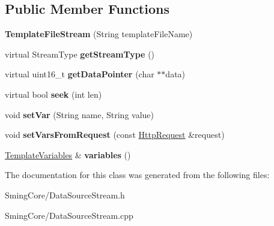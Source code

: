 \subsection*{Public Member Functions}
\begin{DoxyCompactItemize}
\item 
\hypertarget{class_template_file_stream_a3071f6f547c41d51b70e9050f4b8a2d5}{}{\bfseries Template\+File\+Stream} (String template\+File\+Name)\label{class_template_file_stream_a3071f6f547c41d51b70e9050f4b8a2d5}

\item 
\hypertarget{class_template_file_stream_a66a4a81c74f285f1c459243da0f00cc6}{}virtual Stream\+Type {\bfseries get\+Stream\+Type} ()\label{class_template_file_stream_a66a4a81c74f285f1c459243da0f00cc6}

\item 
\hypertarget{class_template_file_stream_a92b7ad7c7c5e4c9e7838d8cae3575f24}{}virtual uint16\+\_\+t {\bfseries get\+Data\+Pointer} (char $\ast$$\ast$data)\label{class_template_file_stream_a92b7ad7c7c5e4c9e7838d8cae3575f24}

\item 
\hypertarget{class_template_file_stream_aacc326b6934851b5c68976c3162b3067}{}virtual bool {\bfseries seek} (int len)\label{class_template_file_stream_aacc326b6934851b5c68976c3162b3067}

\item 
\hypertarget{class_template_file_stream_a9f697351a44ef04b41157e4029bbfd7b}{}void {\bfseries set\+Var} (String name, String value)\label{class_template_file_stream_a9f697351a44ef04b41157e4029bbfd7b}

\item 
\hypertarget{class_template_file_stream_ac03323916ae4c8ae4060a77e6e9d8e46}{}void {\bfseries set\+Vars\+From\+Request} (const \hyperlink{class_http_request}{Http\+Request} \&request)\label{class_template_file_stream_ac03323916ae4c8ae4060a77e6e9d8e46}

\item 
\hypertarget{class_template_file_stream_a0994a359ad2bfc4ea8c209ba3db3b683}{}\hyperlink{class_template_variables}{Template\+Variables} \& {\bfseries variables} ()\label{class_template_file_stream_a0994a359ad2bfc4ea8c209ba3db3b683}

\end{DoxyCompactItemize}


The documentation for this class was generated from the following files\+:\begin{DoxyCompactItemize}
\item 
Sming\+Core/Data\+Source\+Stream.\+h\item 
Sming\+Core/Data\+Source\+Stream.\+cpp\end{DoxyCompactItemize}
